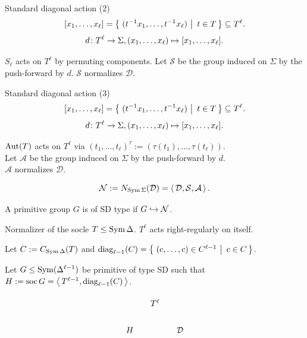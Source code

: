 \documentclass{beamer}
\theoremstyle{plain}
\theoremstyle{definition}
\begin{document}

\begin{frame}{Standard diagonal action (2)}
\[
    [x_1, \ldots, x_\ell]
    =
     \left\{ \left.\, (t ^ {-1} x_1, \ldots, t ^ {-1} x_\ell) ~\right|~ t \in T \,\right\} 
    \subseteq T ^ \ell.
\]
\[
    d \colon T ^ \ell \rightarrow \Sigma,
    (x_1, \ldots, x_\ell)
    \mapsto
    [x_1, \ldots, x_\ell].
\]

$S_\ell$ acts on $T ^ \ell$ by permuting components.
Let $\mathcal S$ be the group induced on $\Sigma$ by the push-forward by $d$.
$\mathcal S$ normalizes $\mathcal D$.
\end{frame}

\begin{frame}{Standard diagonal action (3)}
\[
    [x_1, \ldots, x_\ell]
    =
     \left\{ \left.\, (t ^ {-1} x_1, \ldots, t ^ {-1} x_\ell) ~\right|~ t \in T \,\right\} 
    \subseteq T ^ \ell.
\]
\[
    d \colon T ^ \ell \rightarrow \Sigma,
    (x_1, \ldots, x_\ell)
    \mapsto
    [x_1, \ldots, x_\ell].
\]

$\operatorname{Aut}(T)$ acts on $T ^ \ell$ via
$(t_1, \ldots, t_\ell) ^ \tau := (\tau(t_1), \ldots, \tau(t_\ell))$.
\\
Let $\mathcal A$ be the group induced on $\Sigma$ by the push-forward by $d$.
\\
$\mathcal A$ normalizes $\mathcal D$.

\pause
\begin{equation}
\mathcal N := N_{\operatorname{Sym} \Sigma}(\mathcal D) =  \left\langle \, \mathcal D, \mathcal S, \mathcal A \, \right\rangle .
\end{equation}

A primitive group $G$ is of SD type if $G \hookrightarrow \mathcal N$.
\end{frame}


\begin{frame}{Normalizer of the socle}
$T \leq \operatorname{Sym} \Delta$.
$T ^ \ell$ acts right-regularly on itself.

Let $C := C_{\operatorname{Sym} \Delta}(T)$
and
$\operatorname{diag}_{\ell - 1}(C) =  \left\{ \left.\, (c, \ldots, c) \in C ^ {\ell - 1} ~\right|~  c \in C  \,\right\} $.

Let $G \leq \operatorname{Sym}(\Delta ^ {\ell - 1})$ be primitive of type SD such that
$H := \operatorname{soc} G =  \left\langle \,  T ^ {\ell - 1}, \operatorname{diag}_{\ell - 1}(C)  \, \right\rangle $.

\pause
\[
\begin{tikzcd}[column sep=small, ampersand replacement=\&]
    \&
    T ^ \ell
    \&
    \\
    H
    \&
    \&
    \mathcal D
\end{tikzcd}
\]
\end{frame}
\end{document}
